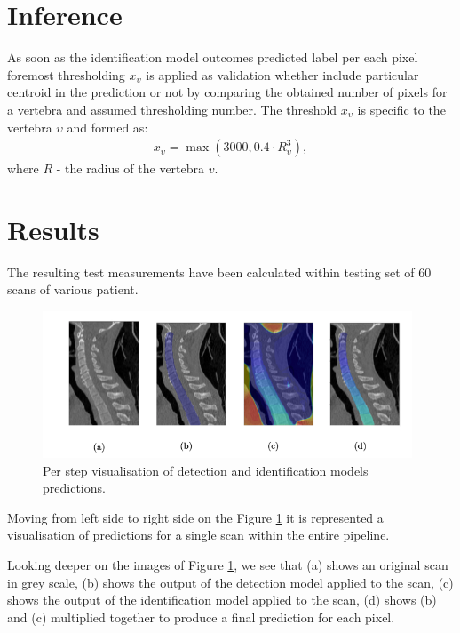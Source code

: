 \section{Inference}
As soon as the identification model outcomes predicted label per each pixel foremost thresholding $x_\upsilon$ is applied as validation whether include particular centroid in the prediction or not by comparing the obtained  number of pixels for a vertebra and assumed thresholding number. The threshold $x_\upsilon$ is specific to the vertebra $\upsilon$ and formed as:
\begin{align*}
  x_\upsilon = \max(3000, 0.4 \cdot R_\upsilon^3),
\end{align*}
where $R$ - the radius of the vertebra $v$.

\section{Results}
The resulting test measurements have been calculated within testing set of 60 scans of various patient.
\begin{figure}[h]
    \centering 
    \includegraphics[width=11cm]{images/detection_identification_steps.png}
    \caption{Per step visualisation of detection and identification  models predictions.}
    \label{fig:step_step_predictions}
\end{figure}
Moving from left side to right side on the Figure \ref{fig:step_step_predictions} it is represented a visualisation of predictions for a single scan within the entire pipeline. 

Looking deeper on the images of 
Figure \ref{fig:step_step_predictions}, we see that (a) shows an original scan in grey scale, (b) shows the output of the detection model applied to the scan, (c) shows the output of the identification model applied to the scan, (d) shows (b) and (c) multiplied together to produce a final prediction for each pixel.

